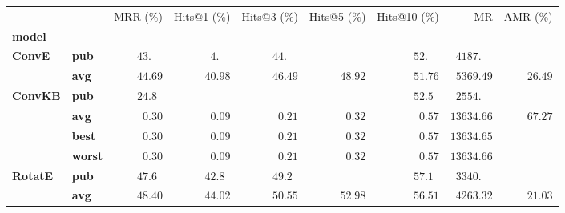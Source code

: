 \begin{tabular}{llrrrrrrr}
\toprule
       &     &           MRR (\%) &                  Hits@1 (\%) &        Hits@3 (\%) &        Hits@5 (\%) &       Hits@10 (\%) &                              MR & AMR (\%) \\
\textbf{model} & {} &                    &                              &                    &                    &                    &                                 &          \\
\midrule
\textbf{ConvE} & \textbf{pub} &  $43.\phantom{00}$ &  $\phantom{0}4.\phantom{00}$ &  $44.\phantom{00}$ &                    &  $52.\phantom{00}$ &  $\phantom{0}4187.\phantom{00}$ &          \\
       & \textbf{avg} &            $44.69$ &                      $40.98$ &            $46.49$ &            $48.92$ &            $51.76$ &            $\phantom{0}5369.49$ &  $26.49$ \\\midrule
\textbf{ConvKB} & \textbf{pub} &  $24.8\phantom{0}$ &                              &                    &                    &  $52.5\phantom{0}$ &  $\phantom{0}2554.\phantom{00}$ &          \\
       & \textbf{avg} &  $\phantom{0}0.30$ &            $\phantom{0}0.09$ &  $\phantom{0}0.21$ &  $\phantom{0}0.32$ &  $\phantom{0}0.57$ &                      $13634.66$ &  $67.27$ \\
       & \textbf{best} &  $\phantom{0}0.30$ &            $\phantom{0}0.09$ &  $\phantom{0}0.21$ &  $\phantom{0}0.32$ &  $\phantom{0}0.57$ &                      $13634.65$ &          \\
       & \textbf{worst} &  $\phantom{0}0.30$ &            $\phantom{0}0.09$ &  $\phantom{0}0.21$ &  $\phantom{0}0.32$ &  $\phantom{0}0.57$ &                      $13634.66$ &          \\\midrule
\textbf{RotatE} & \textbf{pub} &  $47.6\phantom{0}$ &            $42.8\phantom{0}$ &  $49.2\phantom{0}$ &                    &  $57.1\phantom{0}$ &  $\phantom{0}3340.\phantom{00}$ &          \\
       & \textbf{avg} &            $48.40$ &                      $44.02$ &            $50.55$ &            $52.98$ &            $56.51$ &            $\phantom{0}4263.32$ &  $21.03$ \\
\bottomrule
\end{tabular}

